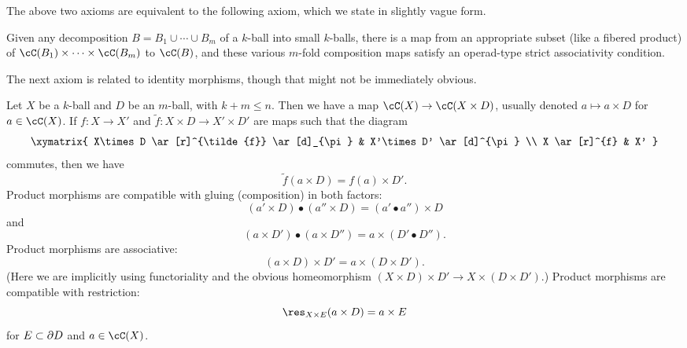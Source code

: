 
The above two axioms are equivalent to the following axiom,
which we state in slightly vague form.

{Given any decomposition $B = B_1\cup\cdots\cup B_m$ of a $k$-ball
into small $k$-balls, there is a 
map from an appropriate subset (like a fibered product) 
of $\cC(B_1)\times\cdots\times\cC(B_m)$ to $\cC(B)$,
and these various $m$-fold composition maps satisfy an
operad-type strict associativity condition.}

The next axiom is related to identity morphisms, though that might not be immediately obvious.

{Let $X$ be a $k$-ball and $D$ be an $m$-ball, with $k+m \le n$.
Then we have a map $\cC(X)\to \cC(X\times D)$, usually denoted $a\mapsto a\times D$ for $a\in \cC(X)$.
If $f:X\to X'$ and $\tilde{f}:X\times D \to X'\times D'$ are maps such that the diagram
\[ \xymatrix{
	X\times D \ar[r]^{\tilde{f}} \ar[d]_{\pi} & X'\times D' \ar[d]^{\pi} \\
	X \ar[r]^{f} & X'
} \]
commutes, then we have 
\[
	\tilde{f}(a\times D) = f(a)\times D' .
\]
Product morphisms are compatible with gluing (composition) in both factors:
\[
	(a'\times D)\bullet(a''\times D) = (a'\bullet a'')\times D
\]
and
\[
	(a\times D')\bullet(a\times D'') = a\times (D'\bullet D'') .
\]
Product morphisms are associative:
\[
	(a\times D)\times D' = a\times (D\times D') .
\]
(Here we are implicitly using functoriality and the obvious homeomorphism
$(X\times D)\times D' \to X\times(D\times D')$.)
Product morphisms are compatible with restriction:
\[
	\res_{X\times E}(a\times D) = a\times E
\]
for $E\subset \partial D$ and $a\in \cC(X)$.
}




